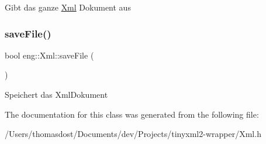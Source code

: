Gibt das ganze \hyperlink{classeng_1_1_xml}{Xml} Dokument aus \mbox{\label{classeng_1_1_xml_a6a3612af5bf49ffb9f92e59e0a47d161}} 
\subsubsection{\texorpdfstring{save\+File()}{saveFile()}}
{\footnotesize\ttfamily bool eng\+::\+Xml\+::save\+File (\begin{DoxyParamCaption}{ }\end{DoxyParamCaption})\hspace{0.3cm}{\ttfamily [inline]}}

Speichert das Xml\+Dokument 

The documentation for this class was generated from the following file\+:\begin{DoxyCompactItemize}
\item 
/\+Users/thomasdost/\+Documents/dev/\+Projects/tinyxml2-\/wrapper/Xml.\+h\end{DoxyCompactItemize}
